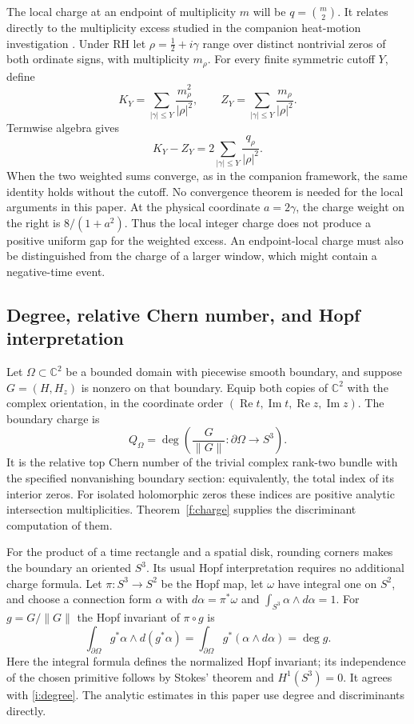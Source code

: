The local charge at an endpoint of multiplicity $m$ will be
$q=\binom m2$. It relates directly to the multiplicity excess studied
in the companion heat-motion investigation \cite{bw10,assessment07}.
Under RH let $\rho=\tfrac12+i\gamma$ range over distinct nontrivial
zeros of both ordinate signs, with multiplicity $m_\rho$. For every
finite symmetric cutoff $Y$, define
\begin{equation}
 K_Y=\sum_{|\gamma|\leq Y}\frac{m_\rho^2}{|\rho|^2},\qquad
 Z_Y=\sum_{|\gamma|\leq Y}\frac{m_\rho}{|\rho|^2}.
 \label{i:weighted}
\end{equation}
Termwise algebra gives
\begin{equation}
 K_Y-Z_Y=2\sum_{|\gamma|\leq Y}\frac{q_\rho}{|\rho|^2}.
 \label{i:bridge}
\end{equation}
When the two weighted sums converge, as in the companion framework,
the same identity holds without the cutoff. No convergence theorem is
needed for the local arguments in this paper. At the physical coordinate
$a=2\gamma$, the charge weight on the right is $8/(1+a^2)$.
Thus the local integer charge does not produce a positive uniform gap
for the weighted excess. An endpoint-local charge must also be
distinguished from the charge of a larger window, which might contain a
negative-time event.

\subsection{Degree, relative Chern number, and Hopf interpretation}

Let $\Omega\subset\mathbb C^2$ be a bounded domain with piecewise smooth
boundary, and suppose $G=(H,H_z)$ is nonzero on that boundary. Equip both
copies of $\mathbb C^2$ with the complex orientation, in the coordinate
order $(\operatorname{Re}t,\operatorname{Im}t,
\operatorname{Re}z,\operatorname{Im}z)$. The boundary charge is
\begin{equation}
 Q_\Omega=\deg\left(\frac{G}{\|G\|}:\partial\Omega\longrightarrow S^3\right).
 \label{i:degree}
\end{equation}
It is the relative top Chern number of the trivial complex rank-two
bundle with the specified nonvanishing boundary section: equivalently,
the total index of its interior zeros. For isolated holomorphic zeros
these indices are positive analytic intersection multiplicities.
Theorem~\ref{f:charge} supplies the discriminant computation of them.

For the product of a time rectangle and a spatial disk, rounding corners
makes the boundary an oriented $S^3$. Its usual Hopf interpretation
requires no additional charge formula. Let $\pi:S^3\to S^2$ be the Hopf
map, let $\omega$ have integral one on $S^2$, and choose a connection
form $\alpha$ with $d\alpha=\pi^*\omega$ and
$\int_{S^3}\alpha\wedge d\alpha=1$. For $g=G/\|G\|$ the Hopf invariant
of $\pi\circ g$ is
\[
 \int_{\partial\Omega}g^*\alpha\wedge d(g^*\alpha)
 =\int_{\partial\Omega}g^*(\alpha\wedge d\alpha)=\deg g.
\]
Here the integral formula defines the normalized Hopf invariant; its
independence of the chosen primitive follows by Stokes' theorem and
$H^1(S^3)=0$. It agrees with \eqref{i:degree}. The analytic estimates
in this paper use degree and discriminants directly.

